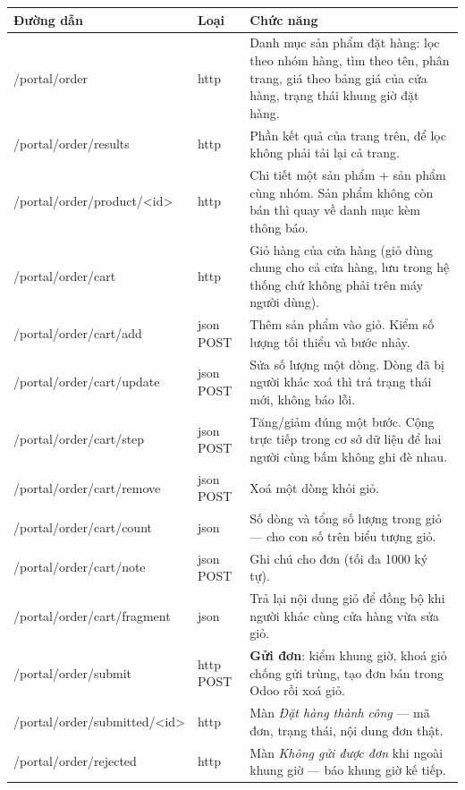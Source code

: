 \documentclass[11pt,a4paper]{report}
\newcommand{\rt}[1]{{\ttfamily\footnotesize #1}}
\begin{document}
{\small
\begin{longtable}{@{}L{5.4cm}L{1.5cm}L{7.5cm}@{}}
\toprule
\textbf{Đường dẫn} & \textbf{Loại} & \textbf{Chức năng} \\
\midrule
\endhead
\rt{/portal/order} & http & Danh mục sản phẩm đặt hàng: lọc theo nhóm hàng, tìm theo tên, phân trang, giá theo bảng giá của cửa hàng, trạng thái khung giờ đặt hàng. \\
\rt{/portal/order/results} & http & Phần kết quả của trang trên, để lọc không phải tải lại cả trang. \\
\rt{/portal/order/product/<id>} & http & Chi tiết một sản phẩm + sản phẩm cùng nhóm. Sản phẩm không còn bán thì quay về danh mục kèm thông báo. \\
\rt{/portal/order/cart} & http & Giỏ hàng của cửa hàng (giỏ dùng chung cho cả cửa hàng, lưu trong hệ thống chứ không phải trên máy người dùng). \\
\rt{/portal/order/cart/add} & json POST & Thêm sản phẩm vào giỏ. Kiểm số lượng tối thiểu và bước nhảy. \\
\rt{/portal/order/cart/update} & json POST & Sửa số lượng một dòng. Dòng đã bị người khác xoá thì trả trạng thái mới, không báo lỗi. \\
\rt{/portal/order/cart/step} & json POST & Tăng/giảm đúng một bước. Cộng trực tiếp trong cơ sở dữ liệu để hai người cùng bấm không ghi đè nhau. \\
\rt{/portal/order/cart/remove} & json POST & Xoá một dòng khỏi giỏ. \\
\rt{/portal/order/cart/count} & json & Số dòng và tổng số lượng trong giỏ — cho con số trên biểu tượng giỏ. \\
\rt{/portal/order/cart/note} & json POST & Ghi chú cho đơn (tối đa 1000 ký tự). \\
\rt{/portal/order/cart/fragment} & json & Trả lại nội dung giỏ để đồng bộ khi người khác cùng cửa hàng vừa sửa giỏ. \\
\rt{/portal/order/submit} & http POST & \textbf{Gửi đơn}: kiểm khung giờ, khoá giỏ chống gửi trùng, tạo đơn bán trong Odoo rồi xoá giỏ. \\
\rt{/portal/order/submitted/<id>} & http & Màn \textit{Đặt hàng thành công} — mã đơn, trạng thái, nội dung đơn thật. \\
\rt{/portal/order/rejected} & http & Màn \textit{Không gửi được đơn} khi ngoài khung giờ — báo khung giờ kế tiếp. \\
\bottomrule
\end{longtable}}
\end{document}
